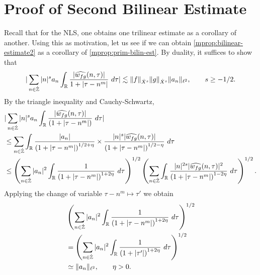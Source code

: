 \section{Proof of Second Bilinear Estimate}
Recall that for the NLS, one obtains one trilinear estimate as a corollary of
another. Using this as motivation, let us see if we can obtain
\cref{mprop:bilinear-estimate2} as a corollary of
\cref{mprop:prim-bilin-est}. By
duality, it suffices to show that
%
\begin{equation}
	\label{mduality-est}
	\begin{split}
	|	\sum_{n \in \dot{\mathbb{Z}}}  |n|^{s}
		a_n \int_{\mathbb{R}} \frac{|\widehat{w_{fg}}(n, \tau)|}{1 
		+ | \tau - n^m |} \ d \tau | \lesssim \|f\|_{\dot{X}^s} \|g\|_{\dot{X}^s}
		\|a_n \|_{\ell^2}, \qquad s \ge -1/2.
	\end{split}
\end{equation}
%
By the triangle inequality 
and Cauchy-Schwartz,
%
\begin{equation}
	\label{m1m}
	\begin{split}
		& | \sum_{n \in \dot{\mathbb{Z}}} |n|^{s} a_n
		\int_{\mathbb{R}}\frac{| \widehat{w_{fg}}(n, \tau) |}{(1 + | \tau - n^m |)} \ d \tau |
		\\
		& \le \sum_{n \in \dot{\mathbb{Z}}} \int_{\mathbb{R}} \frac{| a_n |}{\left( 1 + 
		| \tau - n^m |
		\right)^{1/2 + \eta}} \times \frac{| n|^s  |
		\widehat{w_{fg}}(n, \tau) |}{\left( 
		1 + | \tau - n^m | \right)^{1/2 - \eta}} \ d \tau
		\\
		& \le \left( \sum_{n \in \dot{\mathbb{Z}}} | a_{n} |^2\int_{\mathbb{R}} \frac{1}{\left( 1 + |
		\tau - n^m | \right)^{1 + 2 \eta}} \ d \tau  
		\right)^{1/2} 
		\left ( \sum_{n \in \dot{\mathbb{Z}}}\int_{\mathbb{R}} \frac{|n|^{2s} | \widehat{w_{fg}}(n, \tau) 
		|^2}{\left( 1 + | \tau - n^m | \right)^{1 -2 \eta}}\ d \tau 
		\right)^{1/2}.
	\end{split}
\end{equation}
%
Applying the change of variable $\tau - n^m
\mapsto \tau'$ we obtain  
%
\begin{equation*}
	\begin{split}
		& \left( \sum_{n \in \zzdot} | a_{n} |^2\int_{\rr} \frac{1}{\left( 1 + | \tau -
		n^m | \right)^{1 + 2 \eta}} \ d \tau  
		\right)^{1/2} 
		\\
		& = \left ( \sum_{n \in \zzdot}
		| a_n |^2 
		\int_{\rr} \frac{1}{\left( 1 + | \tau' | \right)^{1 + 2 \eta}} \ d 
		\tau \right)^{1/2}
		\\
		& \simeq \|a_n\|_{\ell^2}, \qquad \eta >0.
		\end{split}
\end{equation*}

